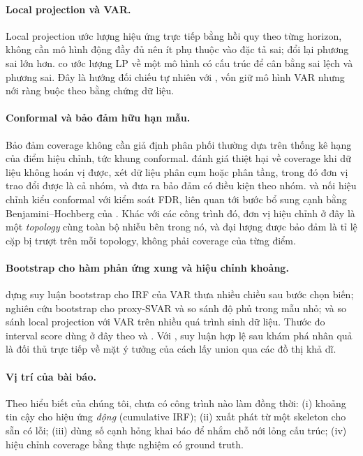 \paragraph{Local projection và VAR.}
Local projection \citep{jorda2005estimation,montiel2021local} ước lượng hiệu ứng trực tiếp bằng hồi quy theo từng horizon, không cần mô hình động đầy đủ nên ít phụ thuộc vào đặc tả sai; đổi lại phương sai lớn hơn. \citet{nemtyrev2026targeted} co ước lượng LP về một mô hình có cấu trúc để cân bằng sai lệch và phương sai. Đây là hướng đối chiếu tự nhiên với \ours{}, vốn giữ mô hình VAR nhưng nới ràng buộc theo bằng chứng dữ liệu.

\paragraph{Conformal và bảo đảm hữu hạn mẫu.}
Bảo đảm coverage không cần giả định phân phối thường dựa trên thống kê hạng của điểm hiệu chỉnh, tức khung conformal. \citet{barber2023conformal} đánh giá thiệt hại về coverage khi dữ liệu không hoán vị được, \citet{dunn2023distribution} xét dữ liệu phân cụm hoặc phân tầng, trong đó đơn vị trao đổi được là cả nhóm, và \citet{gibbs2025conformal} đưa ra bảo đảm có điều kiện theo nhóm. \citet{fithian2022conditional} và \citet{bates2023testing} nối hiệu chỉnh kiểu conformal với kiểm soát FDR, liên quan tới bước bổ sung cạnh bằng Benjamini--Hochberg của \ours{}. Khác với các công trình đó, đơn vị hiệu chỉnh ở đây là một \emph{topology} cùng toàn bộ nhiễu bên trong nó, và đại lượng được bảo đảm là tỉ lệ cặp bị trượt trên mỗi topology, không phải coverage của từng điểm.

\paragraph{Bootstrap cho hàm phản ứng xung và hiệu chỉnh khoảng.}
\citet{krampe2023structural} dựng suy luận bootstrap cho IRF của VAR thưa nhiều chiều sau bước chọn biến; \citet{bruns2022alternative} nghiên cứu bootstrap cho proxy-SVAR và so sánh độ phủ trong mẫu nhỏ; \citet{plagborg2021local} và \citet{li2024local} so sánh local projection với VAR trên nhiều quá trình sinh dữ liệu. Thước đo interval score dùng ở đây theo \citet{bracher2021evaluating} và \citet{gneiting2023model}. Với \citet{gradu2025valid}, suy luận hợp lệ sau khám phá nhân quả là đối thủ trực tiếp về mặt ý tưởng của cách lấy union qua các đồ thị khả dĩ.

\paragraph{Vị trí của bài báo.} Theo hiểu biết của chúng tôi, chưa có công trình nào làm đồng thời: (i) khoảng tin cậy cho hiệu ứng \emph{động} (cumulative IRF); (ii) xuất phát từ một skeleton cho sẵn có lỗi; (iii) dùng số cạnh hỏng khai báo để nhắm chỗ nới lỏng cấu trúc; (iv) hiệu chỉnh coverage bằng thực nghiệm có ground truth.
